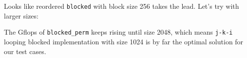 \documentclass[11pt]{article}
\begin{document}
Looks like reordered \texttt{blocked} with block size 256 takes the lead. Let's try with larger sizes:


The Gflops of \texttt{blocked\_perm} keeps rising until size 2048, which means \texttt{j-k-i} looping blocked implementation with size 1024 is by far the optimal solution for our test cases.









\iffalse

\section{Conclusion}
``I always thought something was fundamentally wrong with the universe'' \citep{adams1995hitchhiker}




\fi
\end{document}
